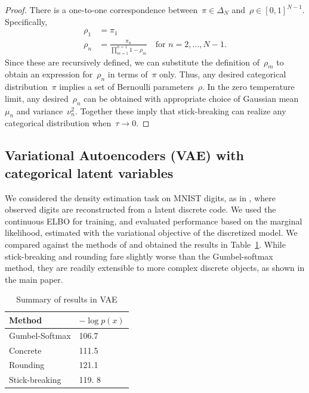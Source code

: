 \begin{proof}
  There is a one-to-one correspondence between~${\pi \in \Delta_N}$
  and~${\rho \in [0,1]^{N-1}}$.  Specifically,
  \begin{align*}
    \rho_1 &= \pi_1 \\
    \rho_n &= \frac{\pi_n}{\prod_{m=1}^{n=1} 1-\rho_m}
             \quad \text{for } n = 2, \ldots, N-1.
  \end{align*}
  Since these are recursively defined, we can substitute the
  definition of~$\rho_m$ to obtain an expression for~$\rho_n$ in terms
  of~$\pi$ only.  Thus, any desired categorical distribution~$\pi$
  implies a set of Bernoulli parameters~$\rho$.  In the zero
  temperature limit, any desired~$\rho_n$ can be obtained with
  appropriate choice of Gaussian mean~$\mu_n$ and
  variance~$\nu_n^2$. Together these imply that stick-breaking can
  realize any categorical distribution when~${\tau \to 0}$.
\end{proof}


\subsection{Variational Autoencoders (VAE) with categorical latent variables}
\label{sec:vae}


We considered the density estimation task on MNIST digits, as in
\citet{maddison2016concrete, jang2016categorical}, where observed
digits are reconstructed from a latent discrete code. We used the
continuous ELBO for training, and evaluated performance based on the
marginal likelihood, estimated with the variational
objective of the discretized model.  We compared against the methods of
\cite{jang2016categorical, maddison2016concrete} and obtained the
results in Table~\ref{tab:vae}.  While stick-breaking and rounding
fare slightly worse than the Gumbel-softmax method, they are readily
extensible to more complex discrete objects, as shown in the main
paper.

\begin{table}[h]
  \caption{Summary of results in VAE}
  \label{tab:vae}
  \centering
  \begin{tabular}{ll}
    \textbf{Method} & $- \log p(x)$ \\
    \hline
    Gumbel-Softmax    & 106.7 \\
    Concrete  &  111.5\\
    Rounding &  121.1 \\
    Stick-breaking & 119. 8\\
    \bottomrule
  \end{tabular}
\end{table}


